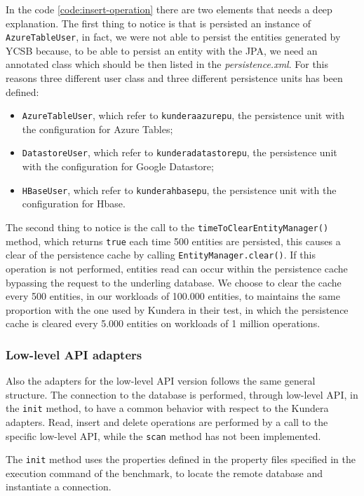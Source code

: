 \noindent In the code \ref{code:insert-operation} there are two elements that needs a deep explanation. The first thing to notice is that is persisted an instance of \texttt{AzureTableUser}, in fact, we were not able to persist the entities generated by YCSB because, to be able to persist an entity with the JPA, we need an annotated class which should be then listed in the \textit{persistence.xml}. For this reasons three different user class and three different persistence units has been defined:
\begin{itemize}
\item \texttt{AzureTableUser}, which refer to \texttt{kundera\textunderscore azure\textunderscore pu}, the persistence unit with the configuration for Azure Tables;
\item \texttt{DatastoreUser}, which refer to \texttt{kundera\textunderscore datastore\textunderscore pu}, the persistence unit with the configuration for Google Datastore;
\item \texttt{HBaseUser}, which refer to \texttt{kundera\textunderscore hbase\textunderscore pu}, the persistence unit with the configuration for Hbase.
\end{itemize} 
\noindent The second thing to notice is the call to the \texttt{timeToClearEntityManager()} method, which returns \texttt{true} each time 500 entities are persisted, this causes a clear of the persistence cache by calling \texttt{EntityManager.clear()}. If this operation is not performed, entities read can occur within the persistence cache bypassing the request to the underling database. We choose to clear the cache every 500 entities, in our workloads of 100.000 entities, to maintains the same proportion with the one used by Kundera in their test, in which the persistence cache is cleared every 5.000 entities on workloads of 1 million operations.

\subsubsection{Low-level API adapters}
Also the adapters for the low-level API version follows the same general structure. The connection to the database is performed, through low-level API, in the \texttt{init} method, to have a common behavior with respect to the Kundera adapters. Read, insert and delete operations are performed by a call to the specific low-level API, while the \texttt{scan} method has not been implemented.

\noindent The \texttt{init} method uses the properties defined in the property files specified in the execution command of the benchmark, to locate the remote database and instantiate a connection.


